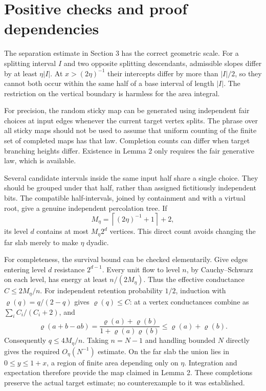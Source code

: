 \documentclass[10pt]{article}
\begin{document}
\section*{Positive checks and proof dependencies}
The separation estimate in Section 3 has the correct geometric scale. For a splitting interval \(I\) and two opposite splitting descendants, admissible slopes differ by at least \(\eta |I|\). At \(x>(2\eta)^{-1}\) their intercepts differ by more than \(|I|/2\), so they cannot both occur within the same half of a base interval of length \(|I|\). The restriction on the vertical boundary is harmless for the area integral.\par
For precision, the random sticky map can be generated using independent fair choices at input edges whenever the current target vertex splits. The phrase over all sticky maps should not be used to assume that uniform counting of the finite set of completed maps has that law. Completion counts can differ when target branching heights differ. Existence in Lemma 2 only requires the fair generative law, which is available.\par
Several candidate intervals inside the same input half share a single choice. They should be grouped under that half, rather than assigned fictitiously independent bits. The compatible half-intervals, joined by containment and with a virtual root, give a genuine independent percolation tree. If \[M_\eta=\left\lceil (2\eta)^{-1}+1\right\rceil+2,\] its level \(d\) contains at most \(M_\eta2^d\) vertices. This direct count avoids changing the far slab merely to make \(\eta\) dyadic.\par
For completeness, the survival bound can be checked elementarily. Give edges entering level \(d\) resistance \(2^{d-1}\). Every unit flow to level \(n\), by Cauchy–Schwarz on each level, has energy at least \(n/(2M_\eta)\). Thus the effective conductance \(C\le2M_\eta/n\). For independent retention probability \(1/2\), induction with \(\varrho(q)=q/(2-q)\) gives \(\varrho(q)\le C\): at a vertex conductances combine as \(\sum_i C_i/(C_i+2)\), and \[\varrho(a+b-ab)
 =\frac{\varrho(a)+\varrho(b)}
        {1+\varrho(a)\varrho(b)}
 \le\varrho(a)+\varrho(b).\] Consequently \(q\le4M_\eta/n\). Taking \(n=N-1\) and handling bounded \(N\) directly gives the required \(O_\eta(N^{-1})\) estimate. On the far slab the union lies in \(0\le y\le1+x\), a region of finite area depending only on \(\eta\). Integration and expectation therefore provide the map claimed in Lemma 2. These completions preserve the actual target estimate; no counterexample to it was established.\par
\end{document}
